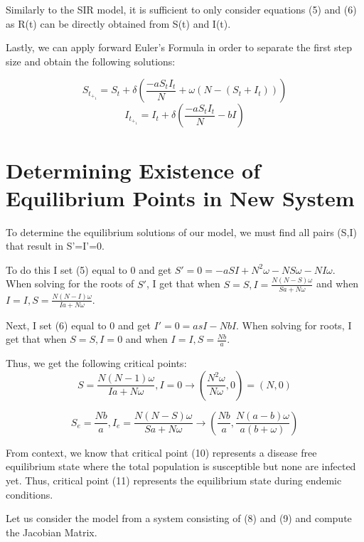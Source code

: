 \documentclass[%
 reprint,
]{revtex4-2}
\begin{document}
Similarly to the SIR model, it is sufficient to only consider equations (5) and (6) as R(t) can be directly obtained from S(t) and I(t). 

Lastly, we can apply forward Euler’s Formula in order to separate the first step size and obtain the following solutions:

\begin{equation} S_t_+_1 = S_t + \delta(\frac{-aS_tI_t}{N} + \omega(N-(S_t + I_t))) \end{equation}
\begin{equation} I_t_+_1 = I_t + \delta(\frac{-aS_tI_t}{N} - bI) \end{equation}

\section{\label{sec:level1}Determining Existence of Equilibrium Points in New System\protect\\}

To determine the equilibrium solutions of our model, we must find all pairs (S,I) that result in S’=I’=0. 

To do this I set (5) equal to 0 and get $S'=0=-aSI + N^2\omega - NS\omega - NI\omega$.
When solving for the roots of $S'$, I get that when $S=S, I=\frac{N(N-S)\omega}{Sa+N\omega}$ and when $I=I, S=\frac{N(N-I)\omega}{Ia+N\omega}$.

Next, I set (6) equal to 0 and get $I'=0=asI-NbI$. When solving for roots, I get that when $S=S, I=0$ and when $I=I, S=\frac{Nb}{a}$.

Thus, we get the following critical points:
\begin{equation} S=\frac{N(N-1)\omega}{Ia+N\omega}, I=0 \rightarrow (\frac{N^2\omega}{N\omega},0) = (N,0)  \end{equation}

\begin{equation} \label{eqn:CP2} S_e=\frac{Nb}{a}, I_e=\frac{N(N-S)\omega}{Sa+N\omega} \rightarrow (\frac{Nb}{a},\frac{N(a-b)\omega}{a(b+\omega)}) \end{equation}

From context, we know that critical point (10) represents a disease free equilibrium state where the total population is susceptible but none are infected yet. Thus, critical point (11) represents the equilibrium state during endemic conditions.

Let us consider the model from a system consisting of (8) and (9) and compute the Jacobian Matrix. \\
\end{document}
